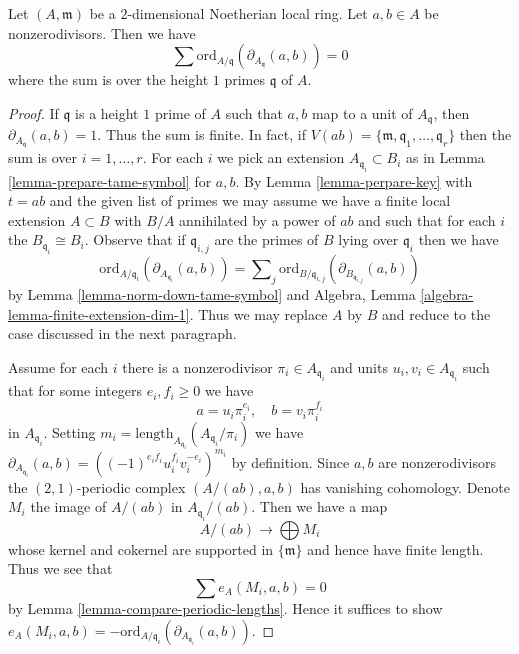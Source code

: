 %
\begin{lemma}
\label{lemma-key-nonzerodivisors}
Let $(A, \mathfrak m)$ be a $2$-dimensional Noetherian local ring.
Let $a, b \in A$ be nonzerodivisors.
Then we have
$$
\sum
\text{ord}_{A/\mathfrak q}(\partial_{A_{\mathfrak q}}(a, b))
=
0
$$
where the sum is over the height $1$ primes $\mathfrak q$ of $A$.
\end{lemma}

\begin{proof}
If $\mathfrak q$ is a height $1$ prime of $A$ such that $a, b$
map to a unit of $A_\mathfrak q$, then $\partial_{A_\mathfrak q}(a, b) = 1$.
Thus the sum is finite. In fact, if
$V(ab) = \{\mathfrak m, \mathfrak q_1, \ldots, \mathfrak q_r\}$
then the sum is over $i = 1, \ldots, r$.
For each $i$ we pick an extension $A_{\mathfrak q_i} \subset B_i$
as in Lemma \ref{lemma-prepare-tame-symbol} for $a, b$.
By Lemma \ref{lemma-perpare-key} with $t = ab$ and the given list of primes
we may assume we have a finite local extension $A \subset B$
with $B/A$ annihilated by a power of $ab$ and such that
for each $i$ the $B_{\mathfrak q_i} \cong B_i$.
Observe that if $\mathfrak q_{i, j}$ are the primes of $B$
lying over $\mathfrak q_i$ then we have
$$
\text{ord}_{A/\mathfrak q_i}(\partial_{A_{\mathfrak q_i}}(a, b))
=
\sum\nolimits_j
\text{ord}_{B/\mathfrak q_{i, j}}(\partial_{B_{\mathfrak q_{i, j}}}(a, b))
$$
by Lemma \ref{lemma-norm-down-tame-symbol} and
Algebra, Lemma \ref{algebra-lemma-finite-extension-dim-1}.
Thus we may replace $A$ by $B$ and
reduce to the case discussed in the next paragraph.

\medskip\noindent
Assume for each $i$ there is a nonzerodivisor
$\pi_i \in A_{\mathfrak q_i}$ and units $u_i, v_i \in A_{\mathfrak q_i}$
such that for some integers $e_i, f_i \geq 0$ we have
$$
a = u_i \pi_i^{e_i},\quad b = v_i \pi_i^{f_i}
$$
in $A_{\mathfrak q_i}$. Setting
$m_i = \text{length}_{A_{\mathfrak q_i}}(A_{\mathfrak q_i}/\pi_i)$
we have
$\partial_{A_{\mathfrak q_i}}(a, b) =
((-1)^{e_if_i}u_i^{f_i}v_i^{-e_i})^{m_i}$ by definition.
Since $a, b$ are nonzerodivisors the
$(2, 1)$-periodic complex $(A/(ab), a, b)$ has vanishing cohomology.
Denote $M_i$ the image of $A/(ab)$ in $A_{\mathfrak q_i}/(ab)$.
Then we have a map
$$
A/(ab) \longrightarrow \bigoplus M_i
$$
whose kernel and cokernel are supported in $\{\mathfrak m\}$
and hence have finite length. Thus we see that
$$
\sum e_A(M_i, a, b) = 0
$$
by Lemma \ref{lemma-compare-periodic-lengths}. Hence it suffices to show
$e_A(M_i, a, b) =
- \text{ord}_{A/\mathfrak q_i}(\partial_{A_{\mathfrak q_i}}(a, b))$.


\end{proof}
